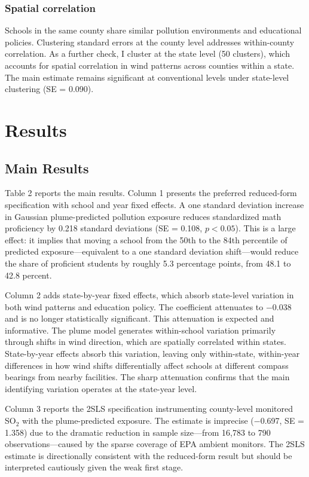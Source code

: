 \documentclass[12pt]{article}
\begin{document}
\subsubsection*{Spatial correlation} Schools in the same county share similar pollution environments and educational policies. Clustering standard errors at the county level addresses within-county correlation. As a further check, I cluster at the state level (50 clusters), which accounts for spatial correlation in wind patterns across counties within a state. The main estimate remains significant at conventional levels under state-level clustering (SE = 0.090).


\section{Results}

\subsection{Main Results}

{\footnotesize}

Table 2 reports the main results. Column 1 presents the preferred reduced-form specification with school and year fixed effects. A one standard deviation increase in Gaussian plume-predicted pollution exposure reduces standardized math proficiency by 0.218 standard deviations (SE = 0.108, $p < 0.05$). This is a large effect: it implies that moving a school from the 50th to the 84th percentile of predicted exposure---equivalent to a one standard deviation shift---would reduce the share of proficient students by roughly 5.3 percentage points, from 48.1 to 42.8 percent.

Column 2 adds state-by-year fixed effects, which absorb state-level variation in both wind patterns and education policy. The coefficient attenuates to $-$0.038 and is no longer statistically significant. This attenuation is expected and informative. The plume model generates within-school variation primarily through shifts in wind direction, which are spatially correlated within states. State-by-year effects absorb this variation, leaving only within-state, within-year differences in how wind shifts differentially affect schools at different compass bearings from nearby facilities. The sharp attenuation confirms that the main identifying variation operates at the state-year level.

Column 3 reports the 2SLS specification instrumenting county-level monitored SO$_2$ with the plume-predicted exposure. The estimate is imprecise ($-$0.697, SE = 1.358) due to the dramatic reduction in sample size---from 16,783 to 790 observations---caused by the sparse coverage of EPA ambient monitors. The 2SLS estimate is directionally consistent with the reduced-form result but should be interpreted cautiously given the weak first stage.
\end{document}
